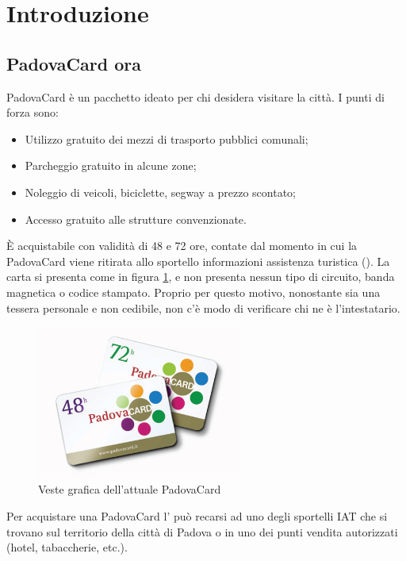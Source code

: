\section{Introduzione}

\subsection{PadovaCard ora}
PadovaCard è un pacchetto ideato per chi desidera visitare la città. 
I punti di forza sono:
\begin{itemize}
\item Utilizzo gratuito dei mezzi di trasporto pubblici comunali;
\item Parcheggio gratuito in alcune zone;
\item Noleggio di veicoli, biciclette, segway a prezzo scontato;
\item Accesso gratuito alle strutture convenzionate.
\end{itemize}
\`E acquistabile con validità di 48 e 72 ore, contate dal momento in cui la PadovaCard viene ritirata allo sportello informazioni assistenza turistica ().
La carta si presenta come in figura \ref{immaginePadovaCard}, e non presenta nessun tipo di circuito, banda magnetica o codice stampato. 
Proprio per questo motivo, nonostante sia una tessera personale e non cedibile, non c'è modo di verificare chi ne è l'intestatario.\\

\begin{figure}[H]
\centering
\includegraphics[width=0.6\textwidth]{images/padovacard.jpg}
\caption{Veste grafica dell'attuale PadovaCard}\label{immaginePadovaCard}
\end{figure}

Per acquistare una PadovaCard l' può recarsi ad uno degli sportelli IAT che si trovano sul territorio della città di Padova o in uno dei punti vendita autorizzati (hotel, tabaccherie, etc.).\\

